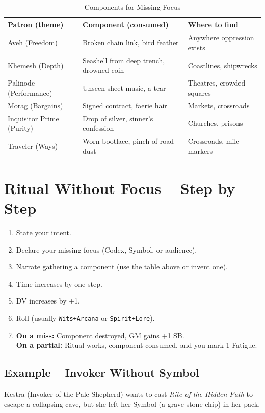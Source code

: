 \documentclass[10pt,a5paper]{book}
\begin{document}
\begin{center}
\begin{longtable}{p{3cm} p{4cm} p{4cm}}
\caption{Components for Missing Focus}\\
\toprule
Patron (theme) & Component (consumed) & Where to find \\
\midrule
Aveh (Freedom) & Broken chain link, bird feather & Anywhere oppression exists \\
Khemesh (Depth) & Seashell from deep trench, drowned coin & Coastlines, shipwrecks \\
Palinode (Performance) & Unseen sheet music, a tear & Theatres, crowded squares \\
Morag (Bargains) & Signed contract, faerie hair & Markets, crossroads \\
Inquisitor Prime (Purity) & Drop of silver, sinner’s confession & Churches, prisons \\
Traveler (Ways) & Worn bootlace, pinch of road dust & Crossroads, mile markers \\
\bottomrule
\end{longtable}
\end{center}

\section{Ritual Without Focus – Step by Step}
\label{sec:ritual-steps}
\begin{enumerate}
    \item State your intent.
    \item Declare your missing focus (Codex, Symbol, or audience).
    \item Narrate gathering a component (use the table above or invent one).
    \item Time increases by one step.
    \item DV increases by +1.
    \item Roll (usually \texttt{Wits+Arcana} or \texttt{Spirit+Lore}).
    \item \textbf{On a miss:} Component destroyed, GM gains +1 SB. \\
          \textbf{On a partial:} Ritual works, component consumed, and you mark 1 Fatigue.
\end{enumerate}

\subsection{Example – Invoker Without Symbol}
Kestra (Invoker of the Pale Shepherd) wants to cast \textit{Rite of the Hidden Path} to escape a collapsing cave, but she left her Symbol (a grave‑stone chip) in her pack.
\end{document}
